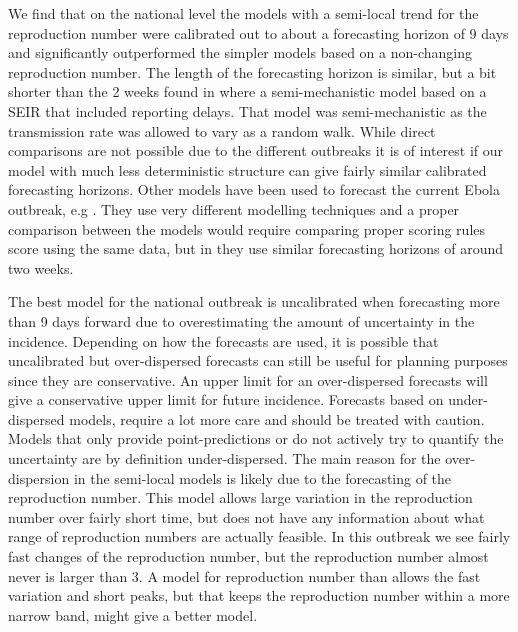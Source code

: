 \documentclass[12pt]{article}
\begin{document}
We find that on the national level the models with a semi-local trend for the reproduction number were calibrated out to about a forecasting horizon of 9 days and significantly outperformed the simpler models based on a non-changing reproduction number. The length of the forecasting horizon is similar, but a bit shorter than the 2 weeks found in \cite{funkAssessingPerformanceRealtime2019} where a semi-mechanistic model based on a SEIR that included reporting delays. That model was semi-mechanistic as the transmission rate was allowed to vary as a random walk. While direct comparisons are not possible due to the different outbreaks it is of interest if our model with much less deterministic structure can give fairly similar calibrated forecasting horizons. Other models have been used to forecast the current Ebola outbreak, e.g \cite{kellyRealtimePredictions201820192019, akhmetzhanovAnalyzingForecastingEbola2019}. They use very different modelling techniques and a proper comparison between the models would require comparing proper scoring rules score using the same data, but in \cite{akhmetzhanovAnalyzingForecastingEbola2019} they use similar forecasting horizons of around two weeks.

The best model for the national outbreak is uncalibrated when forecasting more than 9 days forward due to overestimating the amount of uncertainty in the incidence. Depending on how the forecasts are used, it is possible that uncalibrated but over-dispersed forecasts can still be useful for planning purposes since they are conservative. An upper limit for an over-dispersed forecasts will give a conservative upper limit for future incidence. Forecasts based on under-dispersed models, require a lot more care and should be treated with caution. Models that only provide point-predictions or do not actively try to quantify the uncertainty are by definition under-dispersed. The main reason for the over-dispersion in the semi-local models is likely due to the forecasting of the reproduction number. This model allows large variation in the reproduction number over fairly short time, but does not have any information about what range of reproduction numbers are actually feasible. In this outbreak we see fairly fast changes of the reproduction number, but the reproduction number almost never is larger than 3. A model for reproduction number than allows the fast variation and short peaks, but that keeps the reproduction number within a more narrow band, might give a better model.
\end{document}
